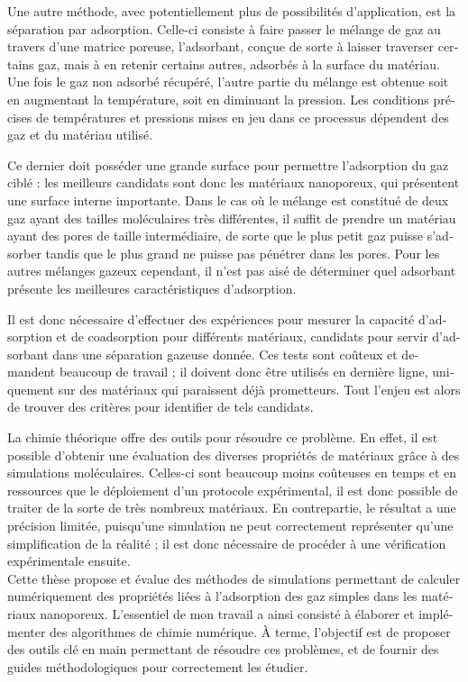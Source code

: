 \documentclass[thesis]{subfiles}
\begin{document}
\begin{otherlanguage}{french}
Une autre méthode, avec potentiellement plus de possibilités d'application, est la séparation par adsorption. Celle-ci consiste à faire passer le mélange de gaz au travers d'une matrice poreuse, l'adsorbant, conçue de sorte à laisser traverser certains gaz, mais à en retenir certains autres, adsorbés à la surface du matériau. Une fois le gaz non adsorbé récupéré, l'autre partie du mélange est obtenue soit en augmentant la température, soit en diminuant la pression. Les conditions précises de températures et pressions mises en jeu dans ce processus dépendent des gaz et du matériau utilisé.

Ce dernier doit posséder une grande surface pour permettre l'adsorption du gaz ciblé : les meilleurs candidats sont donc les matériaux nanoporeux, qui présentent une surface interne importante. Dans le cas où le mélange est constitué de deux gaz ayant des tailles moléculaires très différentes, il suffit de prendre un matériau ayant des pores de taille intermédiaire, de sorte que le plus petit gaz puisse s'adsorber tandis que le plus grand ne puisse pas pénétrer dans les pores. Pour les autres mélanges gazeux cependant, il n'est pas aisé de déterminer quel adsorbant présente les meilleures caractéristiques d'adsorption.

Il est donc nécessaire d'effectuer des expériences pour mesurer la capacité d'adsorption et de coadsorption pour différents matériaux, candidats pour servir d'adsorbant dans une séparation gazeuse donnée. Ces tests sont coûteux et demandent beaucoup de travail ; il doivent donc être utilisés en dernière ligne, uniquement sur des matériaux qui paraissent déjà prometteurs. Tout l'enjeu est alors de trouver des critères pour identifier de tels candidats.

La chimie théorique offre des outils pour résoudre ce problème. En effet, il est possible d'obtenir une évaluation des diverses propriétés de matériaux grâce à des simulations moléculaires. Celles-ci sont beaucoup moins coûteuses en temps et en ressources que le déploiement d'un protocole expérimental, il est donc possible de traiter de la sorte de très nombreux matériaux. En contrepartie, le résultat a une précision limitée, puisqu'une simulation ne peut correctement représenter qu'une simplification de la réalité ; il est donc nécessaire de procéder à une vérification expérimentale ensuite.\\

Cette thèse propose et évalue des méthodes de simulations permettant de calculer numériquement des propriétés liées à l'adsorption des gaz simples dans les matériaux nanoporeux. L'essentiel de mon travail a ainsi consisté à élaborer et implémenter des algorithmes de chimie numérique. À terme, l'objectif est de proposer des outils clé en main permettant de résoudre ces problèmes, et de fournir des guides méthodologiques pour correctement les étudier.


\end{otherlanguage}
\end{document}

